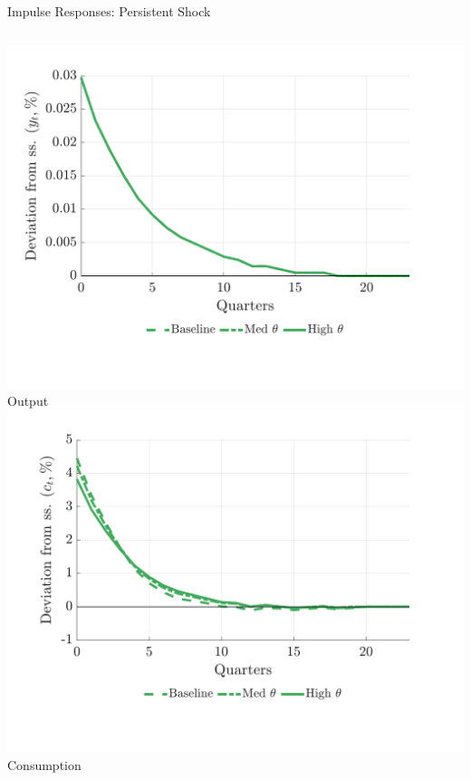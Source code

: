 \documentclass[aspectratio=169,11pt,professionalfonts]{beamer}
\newcommand{\1}{\mathbb{1}}
\begin{document}
\begin{frame}{Impulse Responses: Persistent Shock}
  \begin{columns}[T,onlytextwidth]
    \includegraphics[width=\linewidth]{comparison_figure_17.pdf}\\[-0.5em]
    {\scriptsize Output}
    \includegraphics[width=\linewidth]{comparison_figure_19.pdf}\\[-0.5em]
    {\scriptsize Consumption}

\end{columns}
\end{frame}
\end{document}
